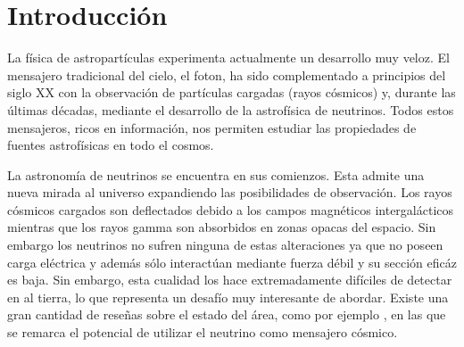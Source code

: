 \chapter{Introducci\'on}
\label{ch:intro}

La f\'isica de astropart\'iculas experimenta actualmente un desarrollo muy veloz. 
El mensajero tradicional del cielo, el foton, ha sido complementado a principios del siglo XX con la observaci\'on de part\'iculas cargadas (rayos c\'osmicos) y, durante las \'ultimas d\'ecadas, mediante el desarrollo de la astrof\'isica de neutrinos.
Todos estos mensajeros, ricos en informaci\'on, nos permiten estudiar las propiedades de fuentes astrof\'isicas en todo el cosmos.

La astronom\'ia de neutrinos se encuentra en sus comienzos. 
Esta admite una nueva mirada al universo expandiendo las posibilidades de observaci\'on.
Los rayos c\'osmicos cargados son deflectados debido a los campos magn\'eticos intergal\'acticos mientras que los rayos gamma son absorbidos en zonas opacas del espacio. 
Sin embargo los neutrinos no sufren ninguna de estas alteraciones ya que no poseen carga el\'ectrica y adem\'as s\'olo interact\'uan mediante fuerza d\'ebil y su secci\'on efic\'az es baja.
Sin embargo, esta cualidad los hace extremadamente dif\'iciles de detectar en al tierra, lo que representa un desaf\'io muy interesante de abordar.
Existe una gran cantidad de rese\~nas sobre el estado del \'area, como por ejemplo \cite{XXX}, en las que se remarca el potencial de utilizar el neutrino como mensajero c\'osmico.

